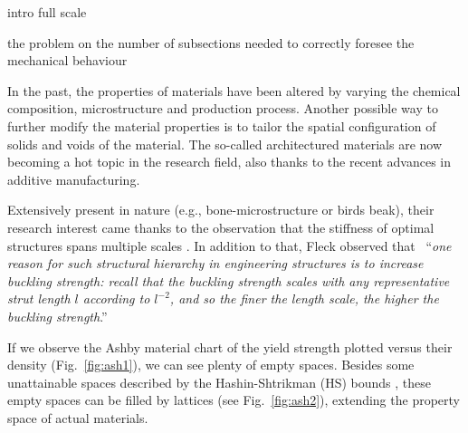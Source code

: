 intro full scale

the problem on the number of subsections needed to correctly foresee the mechanical behaviour

In the past, the properties of materials have been altered by varying the chemical composition, microstructure and production process. Another possible way to further modify the material properties is to tailor the spatial configuration of solids and voids of the material. The so-called architectured materials are now becoming a hot topic in the research field, also thanks to the recent advances in additive manufacturing.

Extensively present in nature (e.g., bone-microstructure or birds beak), their research interest came thanks to the observation that the stiffness of optimal structures spans multiple scales . In addition to that, Fleck observed that ~``\textit{one reason for such structural hierarchy in engineering structures is to increase buckling strength: recall that the buckling strength scales with any representative strut length $l$ according to $l^{-2}$, and so the finer the length scale, the higher the buckling strength}.''

If we observe the Ashby material chart  of the yield strength plotted versus their density (Fig.~\ref{fig:ash1}), we can see plenty of empty spaces. Besides some unattainable spaces described by the Hashin-Shtrikman (HS) bounds , these empty spaces can be filled by lattices (see Fig.~\ref{fig:ash2}), extending the property space of actual materials.


